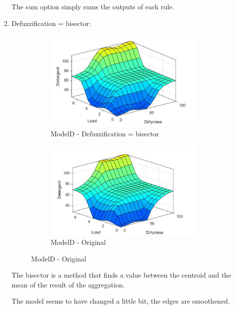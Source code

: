 \documentclass[11pt]{article}
\begin{document}
\begin{enumerate}[label=(\alph*)]
\begin{enumerate}[label=(\roman*)]
    The sum option simply sums the outputs of each rule.

    \item Defuzziﬁcation = bisector:

    \begin{figure}[ht!]
    \centering
    \begin{subfigure}{.5\textwidth}
      \centering
      \includegraphics[width=.9\linewidth]{res/modelD_bisector}
      \caption{ModelD - Defuzziﬁcation = bisector}
      \label{fig:sub1}
    \end{subfigure}%
    \begin{subfigure}{.5\textwidth}
      \centering
      \includegraphics[width=.9\linewidth]{res/image2}
      \caption{ModelD - Original}
      \label{fig:sub2}
    \end{subfigure}
    \end{figure}

    The bisector is a method that finds a value between the centroid and the
    mean of the result of the aggregation.

    The model seems to have changed a little bit, the edges are smoothened.


\end{enumerate}
\end{enumerate}
\end{document}
